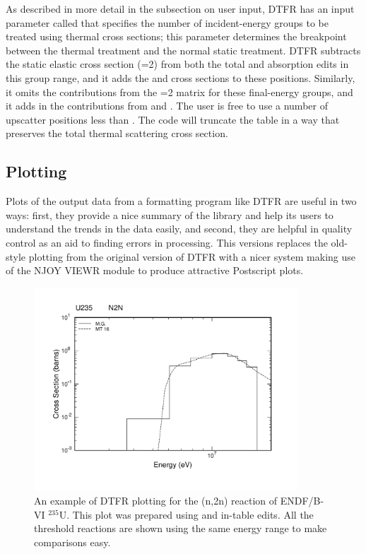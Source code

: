 As described in more detail in the subsection on user input, DTFR
has an input parameter called  that specifies the
number of incident-energy groups to be treated using thermal
cross sections; this parameter determines the breakpoint between
the thermal treatment and the normal static treatment.  DTFR subtracts
the static elastic cross section (=2) from both the total and
absorption edits in this group range, and it adds the 
and  cross sections to these positions.  Similarly, it
omits the contributions from the =2 matrix for these
final-energy groups, and it adds in the contributions from
 and .  The user is free to use a number of
upscatter positions less than .  The code will truncate
the table in a way that preserves the total thermal scattering
cross section.

\subsection{Plotting}
\label{ssDTFR_Plot}

Plots of the output data from a formatting program like DTFR are useful
in two ways: first, they provide a nice summary of the library and help
its users to understand the trends in the data easily, and second,
they are helpful in quality control as an aid to finding errors in
processing.  This versions replaces the old-style plotting from the
original version of DTFR with a nicer system making use of the NJOY
VIEWR module to produce attractive Postscript plots.

\begin{figure}[bp]\centering
\includegraphics[keepaspectratio, height=3.0in, angle=0]{figs/dtfr1ack}
\caption[DTFR cross section plot example]{An example of DTFR plotting for
 the (n,2n) reaction of ENDF/B-VI $^{235}$U.  This plot was prepared using
  and in-table edits.  All the threshold reactions are shown
 using the same energy range to make comparisons easy.}
\label{sing1}
\end{figure}

